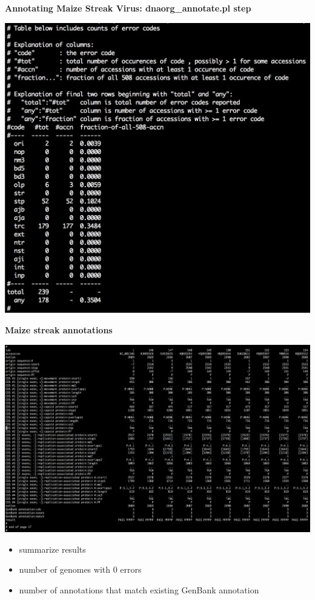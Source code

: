 \documentclass[landscape]{slides}
\begin{document}
\begin{slide}
\begin{center}
\textbf{Annotating Maize Streak Virus: dnaorg\_annotate.pl step} 

\includegraphics[width=8in]{figs/dnaorg-annotate-output3}

\end{center}
\vfill
\end{slide}
\begin{slide}
\begin{center}
\textbf{Maize streak annotations}

\includegraphics[width=8in]{figs/msv-tbl-screenshot}

\begin{itemize}
\item summarize results
\item number of genomes with 0 errors
\item number of annotations that match existing GenBank annotation
\end{itemize}

\end{center}
\vfill
\end{slide}
\end{document}

